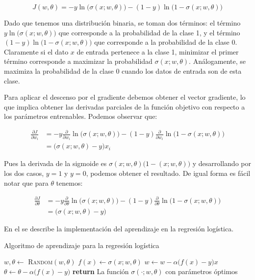\begin{equation*}
    J(w, \theta) = - y \ln\big( \sigma(x; w, \theta)\big) - (1- y) \ln\big( 1-\sigma(x; w, \theta) \big)
\end{equation*}

Dado que tenemos una distribución binaria, se toman dos términos: el término $y \ln\big( \sigma(x; w, \theta)\big)$ que corresponde a la probabilidad de la clase 1, y el término $(1-y) \ln\big( 1-\sigma(x; w, \theta)\big)$ que corresponde a la probabilidad de la clase 0. Claramente si el dato $x$ de entrada pertenece a la clase 1, minimizar el primer término corresponde a maximizar la probabilidad $\sigma(x; w, \theta)$. Análogamente, se maximiza la probabilidad de la clase 0 cuando los datos de entrada son de esta clase.

Para aplicar el descenso por el gradiente debemos obtener el vector gradiente, lo que implica obtener las derivadas parciales de la función objetivo con respecto a los parámetros entrenables. Podemos observar que:

\begin{align*}
    \frac{\partial J }{\partial w_i} &= - y \frac{\partial}{\partial w_i} \ln\big( \sigma(x; w, \theta)\big) - (1- y) \frac{\partial }{\partial w_i}  \ln\big( 1-\sigma(x; w, \theta) \big) \\
        &= \big( \sigma(x; w, \theta) - y \big) x_i 
\end{align*}

Pues la derivada de la sigmoide es $\sigma(x; w, \theta)\big(1-(x; w, \theta)\big)$ y desarrollando por los dos casos, $y=1$ y $y=0$, podemos obtener el resultado. De igual forma es fácil notar que para $\theta$ tenemos:

\begin{align*}
    \frac{\partial J }{\partial \theta} &= - y \frac{\partial}{\partial \theta} \ln\big( \sigma(x; w, \theta)\big) - (1- y) \frac{\partial }{\partial \theta}  \ln\big( 1-\sigma(x; w, \theta) \big) \\
        &= \big( \sigma(x; w, \theta) - y \big)
\end{align*}

En el  se describe la implementación del aprendizaje en la regresión logística.


\begin{algorithm}
 \caption{Algoritmo de aprendizaje para la regresión logística}\label{alg:AlgReg}
 \begin{algorithmic}
    \State $w, \theta \leftarrow$ \textsc{Random}$(w, \theta)$
            \State $f(x) \leftarrow \sigma(x; w, \theta) $
            \State $w \leftarrow w - \alpha \big( f(x) - y \big) x $
            \State $\theta \leftarrow \theta - \alpha \big( f(x) - y \big) $
        \EndFor
    \EndFor
    \State \textbf{return} La función $\sigma(\cdot; w, \theta)$ con parámetros óptimos
  \EndFunction
 \end{algorithmic}
\end{algorithm}

